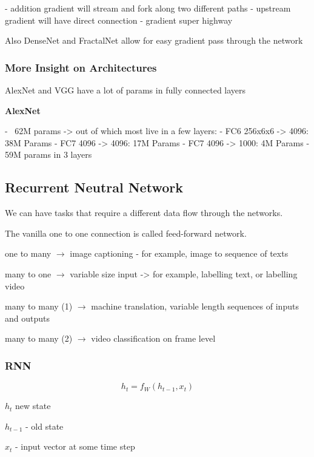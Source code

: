 - addition gradient will stream and fork along two different paths
- upstream gradient will have direct connection - gradient super highway

Also DenseNet and FractalNet allow for easy gradient pass through the network



\subsubsection{More Insight on Architectures }

AlexNet and VGG have a lot of params in fully connected layers

\textbf{AlexNet}

- ~62M params -> out of which most live in a few layers:
  -  FC6 256x6x6 -> 4096: 38M Params
  - FC7 4096 -> 4096: 17M Params
  - FC7 4096 -> 1000: 4M Params
  - 59M params in 3 layers

\subsection{Recurrent Neutral Network }


We can have tasks that require a different data flow through the networks. 

The vanilla one to one connection is called  feed-forward network. 

one to many $\rightarrow$ image captioning - for example, image to sequence of texts

many to one $\rightarrow$ variable size input -> for example, labelling text, or labelling video

many to many (1) $\rightarrow$ machine translation, variable length sequences of inputs and outputs

many to many (2) $\rightarrow$ video classification on frame level

\subsubsection{RNN}


$$h_t = f_W(h_{t-1},x_t) $$

$h_t$ new state

$h_{t-1}$ - old state

$x_t$ -  input vector at some time step

